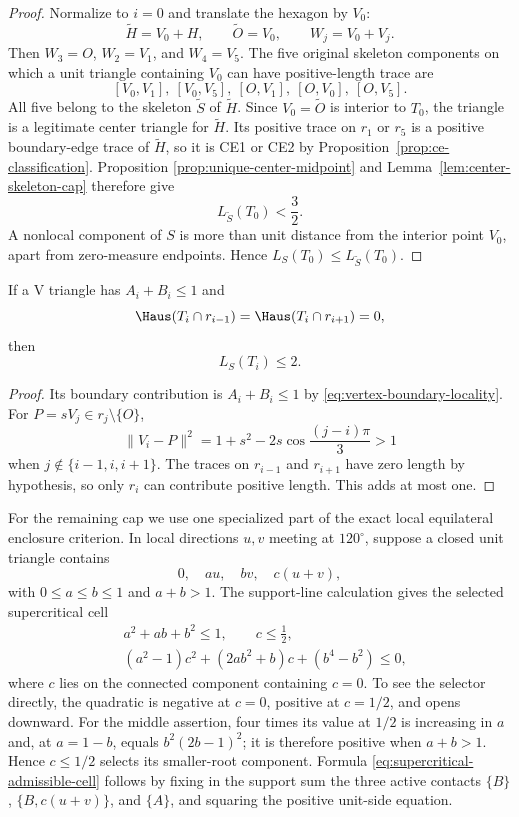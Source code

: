 \begin{proof}
Normalize to $i=0$ and translate the hexagon by $V_0$:
\[
 \widetilde H=V_0+H,\qquad \widetilde O=V_0,\qquad W_j=V_0+V_j.
\]
Then $W_3=O$, $W_2=V_1$, and $W_4=V_5$.  The five original skeleton
components on which a unit triangle containing $V_0$ can have
positive-length trace are
\[
 [V_0,V_1],\ [V_0,V_5],\ [O,V_1],\ [O,V_0],\ [O,V_5].
\]
All five belong to the skeleton $\widetilde S$ of $\widetilde H$.  Since
$V_0=\widetilde O$ is interior to $T_0$, the triangle is a legitimate center
triangle for $\widetilde H$.  Its positive trace on $r_1$ or $r_5$ is a positive
boundary-edge trace of $\widetilde H$, so it is CE1 or CE2 by
Proposition~\ref{prop:ce-classification}.  Proposition
\ref{prop:unique-center-midpoint} and Lemma~\ref{lem:center-skeleton-cap}
therefore give
\[
 L_{\widetilde S}(T_0)<\frac32.
\]
A nonlocal component of $S$ is more than unit distance from the interior
point $V_0$, apart from zero-measure endpoints.  Hence
$L_S(T_0)\le L_{\widetilde S}(T_0)$.
\end{proof}

\begin{lemma}
\label{lem:no-support-skeleton-cap}
If a V triangle has $A_i+B_i\le1$ and
\[
 \Haus(T_i\cap r_{i-1})=\Haus(T_i\cap r_{i+1})=0,
\]
then
\[
 L_S(T_i)\le2.
\]
\end{lemma}

\begin{proof}
Its boundary contribution is $A_i+B_i\le1$ by
\eqref{eq:vertex-boundary-locality}.  For $P=sV_j\in r_j\setminus\{O\}$,
\[
 \lVert V_i-P\rVert^2
 =1+s^2-2s\cos\frac{(j-i)\pi}{3}>1
\]
when $j\notin\{i-1,i,i+1\}$.  The traces on $r_{i-1}$ and $r_{i+1}$ have
zero length by hypothesis, so only $r_i$ can contribute positive length.
This adds at most one.
\end{proof}

For the remaining cap we use one specialized part of the exact local
equilateral enclosure criterion.  In local directions $u,v$ meeting at
$120^\circ$, suppose a closed unit triangle contains
\[
 0,\quad au,\quad bv,\quad c(u+v),
\]
with $0\le a\le b\le1$ and $a+b>1$.  The support-line calculation gives the
selected supercritical cell
\begin{equation}
 \begin{aligned}
 &a^2+ab+b^2\le1,\qquad c\le\frac12,\\
 &(a^2-1)c^2+(2ab^2+b)c+(b^4-b^2)\le0,
 \end{aligned}
 \label{eq:supercritical-admissible-cell}
\end{equation}
where $c$ lies on the connected component containing $c=0$.  To see the
selector directly, the quadratic is negative at $c=0$, positive at
$c=1/2$, and opens downward.  For the middle assertion, four times its value
at $1/2$ is increasing in $a$ and, at $a=1-b$, equals
$b^2(2b-1)^2$; it is therefore positive when $a+b>1$.
Hence $c\le1/2$ selects its smaller-root component.  Formula
\eqref{eq:supercritical-admissible-cell} follows by
fixing in the support sum the three active contacts $\{B\}$,
$\{B,c(u+v)\}$, and $\{A\}$, and squaring the positive unit-side equation.

